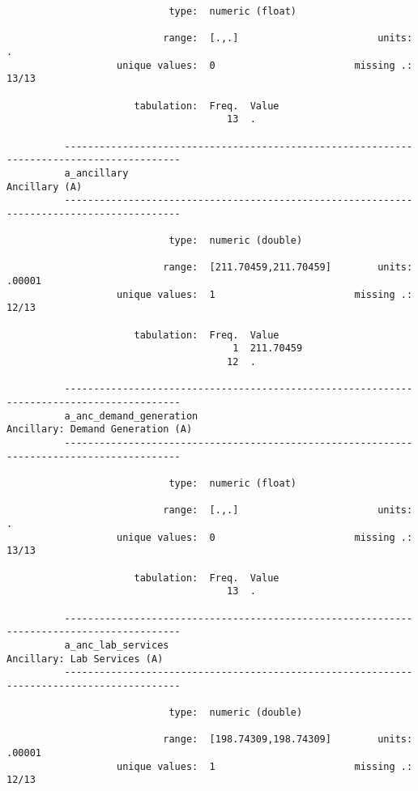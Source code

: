 \documentclass{article}
\begin{document}
\begin{verbatim}
                            type:  numeric (float)
          
                           range:  [.,.]                        units:  .
                   unique values:  0                        missing .:  13/13
          
                      tabulation:  Freq.  Value
                                      13  .
          
          ------------------------------------------------------------------------------------------
          a_ancillary                                                                  Ancillary (A)
          ------------------------------------------------------------------------------------------
          
                            type:  numeric (double)
          
                           range:  [211.70459,211.70459]        units:  .00001
                   unique values:  1                        missing .:  12/13
          
                      tabulation:  Freq.  Value
                                       1  211.70459
                                      12  .
          
          ------------------------------------------------------------------------------------------
          a_anc_demand_generation                                   Ancillary: Demand Generation (A)
          ------------------------------------------------------------------------------------------
          
                            type:  numeric (float)
          
                           range:  [.,.]                        units:  .
                   unique values:  0                        missing .:  13/13
          
                      tabulation:  Freq.  Value
                                      13  .
          
          ------------------------------------------------------------------------------------------
          a_anc_lab_services                                             Ancillary: Lab Services (A)
          ------------------------------------------------------------------------------------------
          
                            type:  numeric (double)
          
                           range:  [198.74309,198.74309]        units:  .00001
                   unique values:  1                        missing .:  12/13
          

\end{verbatim}
\end{document}
